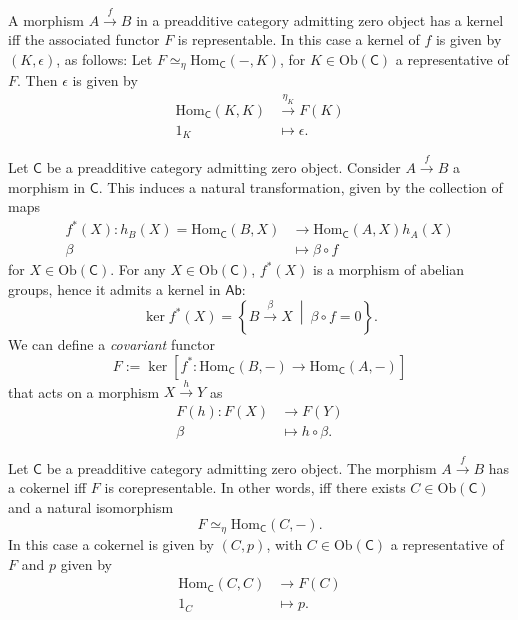 \begin{prop}
	A morphism $A \xrightarrow{f} B$ in a preadditive category admitting zero object has a kernel iff the associated functor $F$ is representable.
	In this case a kernel of $f$ is given by $\left(K, \epsilon\right)$, as follows:
	Let $F \simeq_\eta \mathrm{Hom}_{\mathsf{C}} \left( -, K \right)$, for $K \in \mathrm{Ob} \left(\mathsf{C}\right)$ a representative of $F$.
	Then $\epsilon$ is given by
	\begin{align}
		\mathrm{Hom}_{\mathsf{C}} \left( K, K \right) &\xrightarrow{\eta_K} F(K) \\
		1_K &\mapsto \epsilon
	.\end{align} 
\end{prop} 

\begin{defn}
	Let $\mathsf{C}$ be a preadditive category admitting zero object.
	Consider $A \xrightarrow{f} B$ a morphism in $\mathsf{C}$.
	This induces a natural transformation, given by the collection of maps
	\begin{align}
		f^*(X): h_B(X) = \mathrm{Hom}_{\mathsf{C}} \left( B, X \right) &\to \mathrm{Hom}_{\mathsf{C}} \left( A, X \right) h_A(X) \\
		\beta &\mapsto \beta \circ f
	\end{align} 
	for $X \in \mathrm{Ob} \left(\mathsf{C}\right)$.
	For any $X \in \mathrm{Ob} \left(\mathsf{C}\right)$, $f^*(X)$ is a morphism of abelian groups, hence it admits a kernel in $\mathsf{Ab}$:
	\begin{equation}
		\ker f^*(X) = \left\{ B \xrightarrow{\beta} X \ \middle|\ \beta \circ f = 0 \right\}
	.\end{equation} 
	We can define a \textit{covariant} functor
	\begin{equation}
	F := \ker \left[ f^*: \mathrm{Hom}_{\mathsf{C}} \left( B, - \right) \to \mathrm{Hom}_{\mathsf{C}} \left( A, - \right) \right]
	\end{equation} 
	that acts on a morphism $X \xrightarrow{h} Y$ as
	\begin{align}
		F(h): F(X) &\to F(Y) \\
		\beta &\mapsto h \circ \beta
	.\end{align} 
\end{defn}

\begin{prop}
	Let $\mathsf{C}$ be a preadditive category admitting zero object.
	The morphism $A \xrightarrow{f} B$ has a cokernel iff $F$ is corepresentable.
	In other words, iff there exists $C \in \mathrm{Ob} \left(\mathsf{C}\right)$ and a natural isomorphism
	\begin{equation}
	F \simeq_\eta \mathrm{Hom}_{\mathsf{C}} \left( C, - \right)
	.\end{equation} 
	In this case a cokernel is given by $\left(C, p\right)$, with $C \in \mathrm{Ob} \left(\mathsf{C}\right)$ a representative of $F$ and $p$ given by
	\begin{align}
		\mathrm{Hom}_{\mathsf{C}} \left( C, C \right) &\to F(C) \\
		1_C &\mapsto p
	.\end{align} 
\end{prop} 

